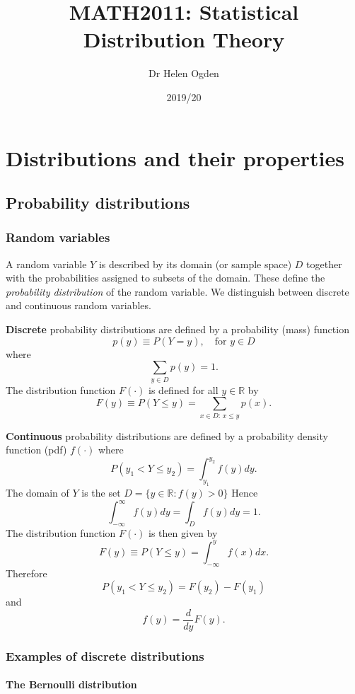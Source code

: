 \documentclass[]{book}
\title{MATH2011: Statistical Distribution Theory}
\author{Dr Helen Ogden}
\date{2019/20}
\theoremstyle{definition}
\theoremstyle{definition}
\theoremstyle{definition}
\theoremstyle{remark}
\begin{document}
\maketitle

{
\setcounter{tocdepth}{1}
\tableofcontents
}
\part{Distributions and their
properties}\label{part-distributions-and-their-properties}

\chapter{Probability distributions}\label{probability-distributions}

\section{Random variables}\label{random-variables}

A random variable \(Y\) is described by its domain (or sample space)
\(D\) together with the probabilities assigned to subsets of the domain.
These define the \emph{probability distribution} of the random variable.
We distinguish between discrete and continuous random variables.

\textbf{Discrete} probability distributions are defined by a probability
(mass) function \[p(y)\equiv P(Y=y), \quad \text{for $y \in D$}\] where
\[\sum_{y\in D} p(y) =1.\] The distribution function \(F(\cdot)\) is
defined for all \(y \in \mathbb{R}\) by
\[F(y)\equiv P(Y \leq y) = \sum_{x\in D: \, x\leq y} p(x).\]

\textbf{Continuous} probability distributions are defined by a
probability density function (pdf) \(f(\cdot)\) where
\[P(y_1< Y \leq y_2) = \int_{y_1}^{y_2} f(y) dy.\] The domain of \(Y\)
is the set \(D = \{y \in \mathbb{R}: f(y) > 0\}\) Hence
\[\int_{-\infty}^\infty f(y) dy = \int_D f(y) dy = 1.\] The distribution
function \(F(\cdot)\) is then given by
\[F(y)\equiv P(Y \leq y) = \int_{-\infty}^y f(x) dx.\] Therefore
\[P(y_1< Y \leq y_2) = F(y_2) - F(y_1)\] and
\[f(y) = \frac{d}{dy} F(y).\]

\section{Examples of discrete
distributions}\label{examples-of-discrete-distributions}

\subsection{The Bernoulli
distribution}\label{the-bernoulli-distribution}
\end{document}
